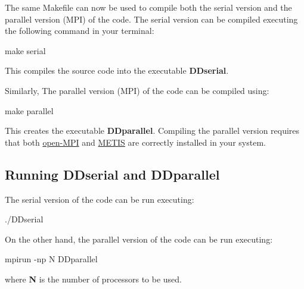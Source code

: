 The same Makefile can now be used to compile both the serial version and the parallel version (M\+P\+I) of the code. The serial version can be compiled executing the following command in your terminal\+: \begin{DoxyVerb}make serial
\end{DoxyVerb}
 This compiles the source code into the executable {\bfseries D\+Dserial}.

Similarly, The parallel version (M\+P\+I) of the code can be compiled using\+: \begin{DoxyVerb}make parallel 
\end{DoxyVerb}
 This creates the executable {\bfseries D\+Dparallel}. Compiling the parallel version requires that both \hyperlink{openmpi}{open-\/\+M\+P\+I} and \hyperlink{metis}{M\+E\+T\+I\+S} are correctly installed in your system.\hypertarget{_p_i_chargedparticles_FRsource_run}{}\subsection{Running D\+Dserial and D\+Dparallel}\label{_p_i_chargedparticles_FRsource_run}
The serial version of the code can be run executing\+: \begin{DoxyVerb}./DDserial
\end{DoxyVerb}


On the other hand, the parallel version of the code can be run executing\+: \begin{DoxyVerb}mpirun -np N DDparallel
\end{DoxyVerb}
 where {\bfseries N} is the number of processors to be used.

